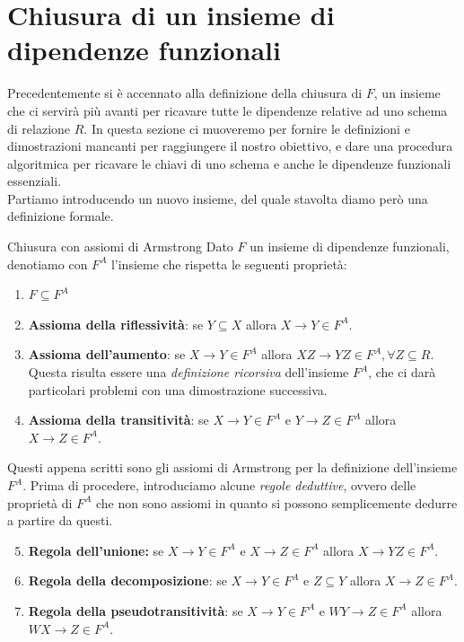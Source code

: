 \documentclass[12pt]{report}
\newcommand{\ra}{
	\rightarrow
}
\begin{document}
	\section{Chiusura di un insieme di dipendenze funzionali}
	Precedentemente si è accennato alla definizione della chiusura di $F$, un insieme che ci servirà più avanti per ricavare tutte le dipendenze relative ad uno schema di relazione $R$. In questa sezione ci muoveremo per fornire le definizioni e dimostrazioni mancanti per raggiungere il nostro obiettivo, e dare una procedura algoritmica per ricavare le chiavi di uno schema e anche le dipendenze funzionali essenziali.\\
	Partiamo introducendo un nuovo insieme, del quale stavolta diamo però una definizione formale.
	\begin{definizione}{Chiusura con assiomi di Armstrong}{}
		Dato $F$ un insieme di dipendenze funzionali, denotiamo con $F^A$ l'insieme che rispetta le seguenti proprietà:
		\begin{enumerate}
			\item $F \subseteq F^A$
			
			\item \textbf{Assioma della riflessività}: se $Y \subseteq X$ allora $X \ra Y \in F^A$.
			
			\item \textbf{Assioma dell'aumento}: se $X \ra Y \in F^A$ allora $XZ \ra YZ \in F^A, \forall Z \subseteq R$. Questa risulta essere una \textit{definizione ricorsiva} dell'insieme $F^A$, che ci darà particolari problemi con una dimostrazione successiva.
			
			\item \textbf{Assioma della transitività}: se $X \ra Y \in F^A$ e $Y \ra Z \in F^A$ allora $X \ra Z \in F^A$.
		\end{enumerate}
	\end{definizione}
	
	Questi appena scritti sono gli assiomi di Armstrong per la definizione dell'insieme $F^A$. Prima di procedere, introduciamo alcune \textit{regole deduttive}, ovvero delle proprietà di $F^A$ che non sono assiomi in quanto si possono semplicemente dedurre a partire da questi.
	\begin{enumerate}
		\setcounter{enumi}{4}
		\item \textbf{Regola dell'unione:} se $X \ra Y \in F^A$ e $X \ra Z \in F^A$ allora $X \ra YZ \in F^A$.
		
		\item \textbf{Regola della decomposizione}: se $X \ra Y \in F^A$ e $Z \subseteq Y$ allora $X \ra Z \in F^A$.
		
		\item \textbf{Regola della pseudotransitività}: se $X \ra Y \in F^A$ e $WY \ra Z \in F^A$ allora $WX \ra Z \in F^A$.
	\end{enumerate}
	
\end{document}
